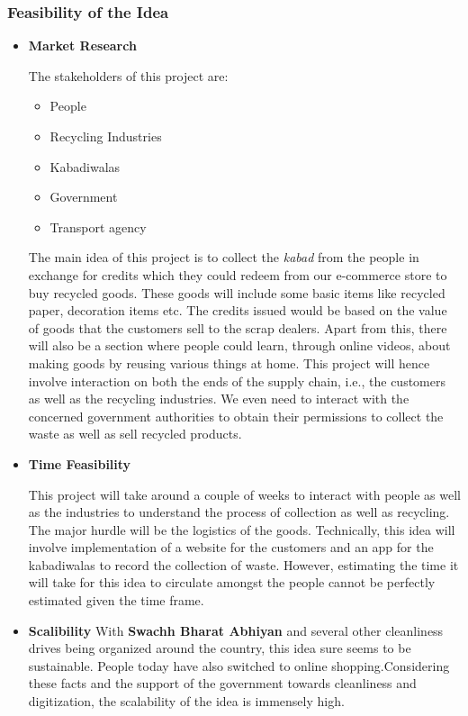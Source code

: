 \documentclass{article}
\begin{document}
\subsubsection{Feasibility of the Idea}
\begin{itemize}
    \item \textbf{Market Research}
    \par The stakeholders of this project are:
    \begin{itemize}
        \item People
        \item Recycling Industries
        \item Kabadiwalas
        \item Government
        \item Transport agency
    \end{itemize}
    The main idea of this project is to collect the \textit{kabad} from the people in exchange for credits which they could redeem from our e-commerce store to buy recycled goods. These goods will include some basic items like recycled paper, decoration items etc. The credits issued would be based on the value of goods that the customers sell to the scrap dealers. Apart from this, there will also be a section where people could learn, through online videos, about making goods by reusing various things at home. This project will hence involve interaction on both the ends of the supply chain, i.e., the customers as well as the recycling industries. We even need to interact with the concerned government authorities to obtain their permissions to collect the waste as well as sell recycled products.
    \item \textbf{Time Feasibility}
    \par This project will take around a couple of weeks to interact with people as well as the industries to understand the process of collection as well as recycling. The major hurdle will be the logistics of the goods. Technically, this idea will involve implementation of a website for the customers and an app for the kabadiwalas to record the collection of waste. However, estimating the time it will take for this idea to circulate amongst the people cannot be perfectly estimated given the time frame.
    \item \textbf{Scalibility}
    With \textbf{Swachh Bharat Abhiyan} and several other cleanliness drives being organized around the country, this idea sure seems to be sustainable. People today have also switched to online shopping.Considering these facts and the support of the government towards cleanliness and digitization, the scalability of the idea is immensely high.
    
\end{itemize}
\end{document}
